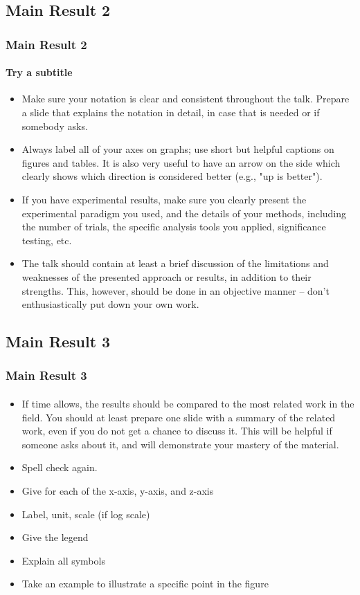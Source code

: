 \documentclass[11pt]{beamer}              %
\begin{document}
\subsection{Main Result 2}
\begin{frame}
\frametitle{Main Result 2}
\framesubtitle{Try a subtitle}
\begin{itemize}
\item Make sure your notation is clear and consistent throughout the talk. Prepare a slide that explains the notation in detail, in case that is needed or if somebody asks.
\item Always label all of your axes on graphs; use short but helpful captions on figures and tables. It is also very useful to have an arrow on the side which clearly shows which direction is considered better (e.g., "up is better").
\item If you have experimental results, make sure you clearly present the experimental paradigm you used, and the details of your methods, including the number of trials, the specific analysis tools you applied, significance testing, etc.
\item The talk should contain at least a brief discussion of the limitations and weaknesses of the presented approach or results, in addition to their strengths. This, however, should be done in an objective manner -- don't enthusiastically put down your own work.
\end{itemize}
\end{frame}


\subsection{Main Result 3}
\begin{frame}
\frametitle{Main Result 3}
\framesubtitle{}
\begin{itemize}
\item If time allows, the results should be compared to the most related work in the field. You should at least prepare one slide with a summary of the related work, even if you do not get a chance to discuss it. This will be helpful if someone asks about it, and will demonstrate your mastery of the material.
\item Spell check again.
\item Give for each of the x-axis, y-axis, and z-axis
\item Label, unit, scale (if log scale)
\item Give the legend
\item Explain all symbols
\item Take an example to illustrate a specific point in the figure
\end{itemize}
\end{frame}
\end{document}
